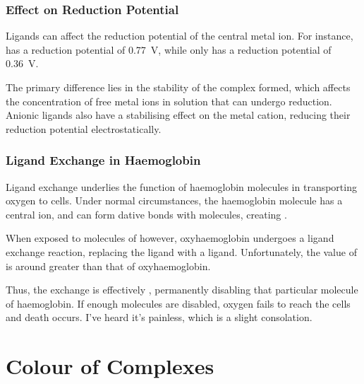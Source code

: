 


			\subsubsection{Effect on Reduction Potential}

				Ligands can affect the reduction potential of the central metal ion. For instance,  has a reduction
				potential of \SI[retain-explicit-plus]{+0.77}{\volt}, while  only has a reduction potential of
				\SI[retain-explicit-plus]{+0.36}{\volt}.

				The primary difference lies in the stability of the complex formed, which affects the concentration of free metal ions in
				solution that can undergo reduction. Anionic ligands also have a stabilising effect on the metal cation, reducing their
				reduction potential electrostatically.



			\subsubsection{Ligand Exchange in Haemoglobin}

				Ligand exchange underlies the function of haemoglobin molecules in transporting oxygen to cells. Under normal
				circumstances, the haemoglobin molecule has a central  ion, and can  form dative bonds with 
				molecules, creating .

				When exposed to molecules of  however, oxyhaemoglobin undergoes a ligand exchange reaction, replacing the  ligand
				with a  ligand. Unfortunately, the  value of  is around  greater
				than that of oxyhaemoglobin.

				Thus, the exchange is effectively , permanently disabling that particular molecule of haemoglobin.
				If enough molecules are disabled, oxygen fails to reach the cells and death occurs. I've heard it's painless,
				which is a slight consolation.




	\section{Colour of Complexes}

